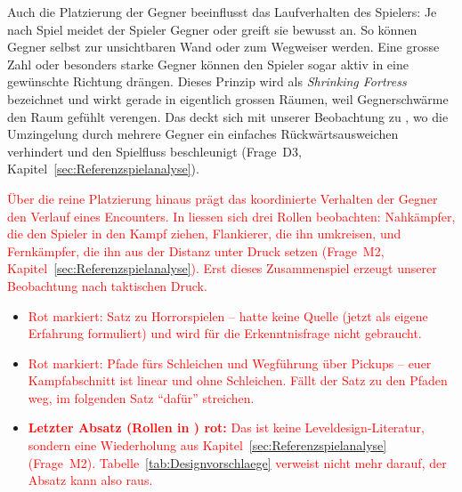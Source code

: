 \documentclass[../Main.tex]{subfiles}
\begin{document}
Auch die Platzierung der Gegner beeinflusst das Laufverhalten des Spielers: Je nach Spiel meidet der Spieler Gegner oder greift sie bewusst an. So können Gegner selbst zur unsichtbaren Wand oder zum Wegweiser werden.\autocite[199]{totten2014architectural} Eine grosse Zahl oder besonders starke Gegner können den Spieler sogar aktiv in eine gewünschte Richtung drängen. Dieses Prinzip wird als \textit{Shrinking Fortress} bezeichnet und wirkt gerade in eigentlich grossen Räumen, weil Gegnerschwärme den Raum gefühlt verengen.\autocite[199--200]{totten2014architectural} Das deckt sich mit unserer Beobachtung zu , wo die Umzingelung durch mehrere Gegner ein einfaches Rückwärtsausweichen verhindert und den Spielfluss beschleunigt (Frage~D3, Kapitel~\ref{sec:Referenzspielanalyse}).

\textcolor{red}{Über die reine Platzierung hinaus prägt das koordinierte Verhalten der Gegner den Verlauf eines Encounters. In  liessen sich drei Rollen beobachten: Nahkämpfer, die den Spieler in den Kampf ziehen, Flankierer, die ihn umkreisen, und Fernkämpfer, die ihn aus der Distanz unter Druck setzen (Frage~M2, Kapitel~\ref{sec:Referenzspielanalyse}). Erst dieses Zusammenspiel erzeugt unserer Beobachtung nach taktischen Druck.}

\begin{itemize}[leftmargin=1.5cm]
    \item \textcolor{red}{Rot markiert: Satz zu Horrorspielen -- hatte keine Quelle (jetzt als eigene Erfahrung formuliert) und wird für die Erkenntnisfrage nicht gebraucht.}
    \item \textcolor{red}{Rot markiert: Pfade fürs Schleichen und Wegführung über Pickups -- euer Kampfabschnitt ist linear und ohne Schleichen. Fällt der Satz zu den Pfaden weg, im folgenden Satz \enquote{dafür} streichen.}
    \item \textcolor{red}{\textbf{Letzter Absatz (Rollen in ) rot:} Das ist keine Leveldesign-Literatur, sondern eine Wiederholung aus Kapitel~\ref{sec:Referenzspielanalyse} (Frage~M2). Tabelle~\ref{tab:Designvorschlaege} verweist nicht mehr darauf, der Absatz kann also raus.}
\end{itemize}
\end{document}
